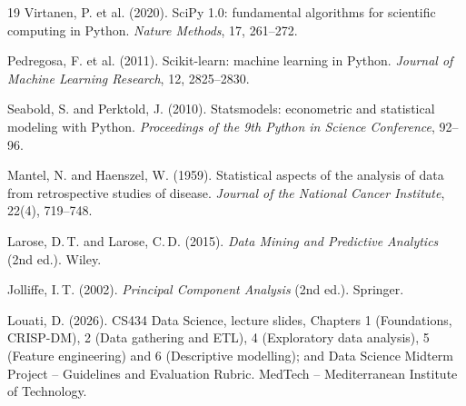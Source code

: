 \begin{thebibliography}{19}
 Virtanen, P. et al. (2020). SciPy 1.0: fundamental algorithms for scientific computing in Python. \emph{Nature Methods}, 17, 261--272.

 Pedregosa, F. et al. (2011). Scikit-learn: machine learning in Python. \emph{Journal of Machine Learning Research}, 12, 2825--2830.

 Seabold, S. and Perktold, J. (2010). Statsmodels: econometric and statistical modeling with Python. \emph{Proceedings of the 9th Python in Science Conference}, 92--96.

 Mantel, N. and Haenszel, W. (1959). Statistical aspects of the analysis of data from retrospective studies of disease. \emph{Journal of the National Cancer Institute}, 22(4), 719--748.

 Larose, D.\,T. and Larose, C.\,D. (2015). \emph{Data Mining and Predictive Analytics} (2nd ed.). Wiley.

 Jolliffe, I.\,T. (2002). \emph{Principal Component Analysis} (2nd ed.). Springer.

 Louati, D. (2026). CS434 Data Science, lecture slides, Chapters 1 (Foundations, CRISP-DM), 2 (Data gathering and ETL), 4 (Exploratory data analysis), 5 (Feature engineering) and 6 (Descriptive modelling); and Data Science Midterm Project -- Guidelines and Evaluation Rubric. MedTech -- Mediterranean Institute of Technology.

\end{thebibliography}
